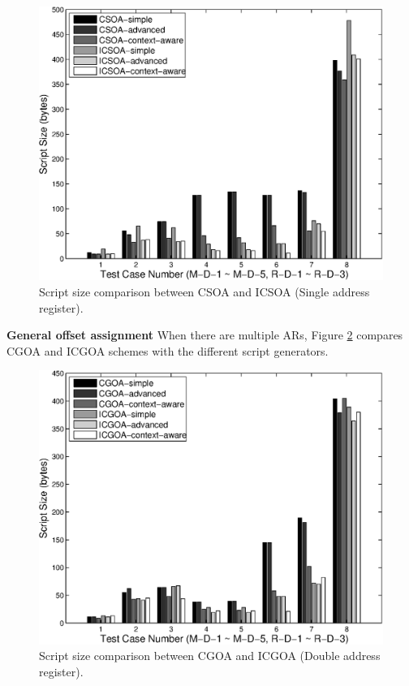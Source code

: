 \begin{figure}[htbp]
\centering
\includegraphics[scale=0.6]{./figures/update.eps}
\caption{Script size comparison between CSOA and ICSOA (Single address register).}
\label{update}
\vspace{-0.1in}
\end{figure}

\textbf{General offset assignment}
When there are multiple ARs, Figure \ref{update2} compares CGOA and ICGOA schemes with the different script generators. 

\begin{figure}[htbp]
\centering
\includegraphics[scale=0.6]{./figures/update2.eps}
\caption{Script size comparison between CGOA and ICGOA (Double address register).}
\label{update2}
\vspace{-0.2in}
\end{figure}

